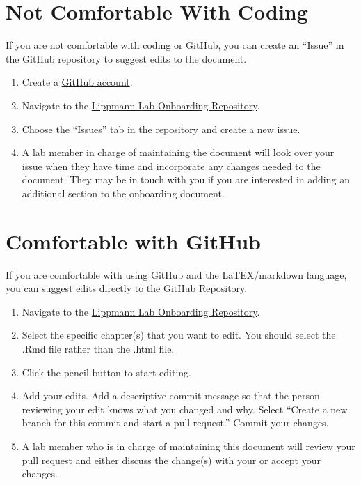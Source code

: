 \documentclass[
]{book}
\begin{document}
\hypertarget{not-comfortable-with-coding}{%
\section{Not Comfortable With Coding}\label{not-comfortable-with-coding}}

If you are not comfortable with coding or GitHub, you can create an ``Issue'' in the GitHub repository to suggest edits to the document.

\begin{enumerate}
\def\labelenumi{\arabic{enumi}.}
\item
  Create a \href{https://github.com/}{GitHub account}.
\item
  Navigate to the \href{https://github.com/LippmannLab/Lippmann-Lab-Onboarding}{Lippmann Lab Onboarding Repository}.
\item
  Choose the ``Issues'' tab in the repository and create a new issue.
\item
  A lab member in charge of maintaining the document will look over your issue when they have time and incorporate any changes needed to the document. They may be in touch with you if you are interested in adding an additional section to the onboarding document.
\end{enumerate}

\hypertarget{comfortable-with-github}{%
\section{Comfortable with GitHub}\label{comfortable-with-github}}

If you are comfortable with using GitHub and the LaTEX/markdown language, you can suggest edits directly to the GitHub Repository.

\begin{enumerate}
\def\labelenumi{\arabic{enumi}.}
\item
  Navigate to the \href{https://github.com/LippmannLab/Lippmann-Lab-Onboarding}{Lippmann Lab Onboarding Repository}.
\item
  Select the specific chapter(s) that you want to edit. You should select the .Rmd file rather than the .html file.
\item
  Click the pencil button to start editing.
\item
  Add your edits. Add a descriptive commit message so that the person reviewing your edit knows what you changed and why. Select ``Create a new branch for this commit and start a pull request.'' Commit your changes.
\item
  A lab member who is in charge of maintaining this document will review your pull request and either discuss the change(s) with your or accept your changes.
\end{enumerate}
\end{document}
